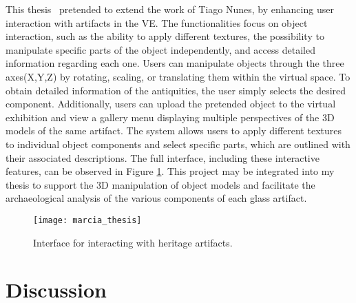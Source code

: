 This thesis~\cite{campanha2024heritage} pretended to extend the work of Tiago Nunes, by enhancing user interaction with 
artifacts in the \gls{VE}. The functionalities focus on object interaction, such as the ability to apply different textures, the possibility to manipulate specific parts of the object independently, and access detailed information regarding each one.
Users can manipulate objects through the three axes(X,Y,Z) by rotating, scaling, or translating them within the virtual space.
To obtain detailed information of the antiquities, the user simply selects the desired component.
Additionally, users can upload the pretended object to the virtual exhibition and view a gallery menu displaying multiple perspectives of the \gls{3D} models of the same artifact.
The system allows users to apply different textures to individual object components and select specific parts, which are outlined with their associated descriptions.
The full interface, including these interactive features, can be observed in Figure \ref{fig:marcia_image}.
This project may be integrated into my thesis to support the \gls{3D} manipulation of object models and facilitate the archaeological analysis of the various components of each glass artifact.

\begin{figure}[h!]
  \centering
  \texttt{[image: marcia\_thesis]}
  \caption{Interface for interacting with heritage artifacts.}
  \label{fig:marcia_image}
\end{figure}
\FloatBarrier


\section{Discussion}
\label{sec:discussion}

\newcommand{\cmark}{\ding{51}} %
\newcommand{\xmark}{\ding{55}} %


